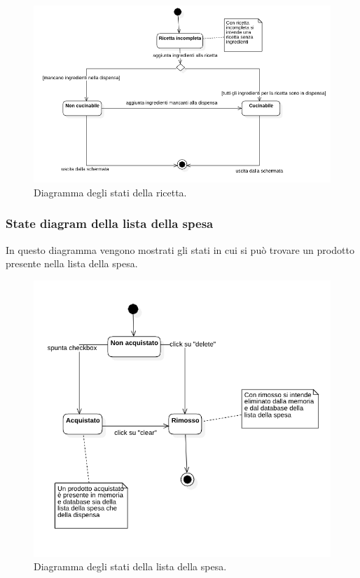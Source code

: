 \documentclass{article}
\begin{document}
\begin{figure}[H]
    \includegraphics[width=\linewidth]{images/state-recipe.png}
    \caption{Diagramma degli stati della ricetta.}
    \label{fig:staterecipe}
\end{figure}

\subsubsection{State diagram della lista della spesa}

In questo diagramma vengono mostrati gli stati in cui si può trovare un prodotto presente nella lista della spesa.

\begin{figure}[H]
    \includegraphics[width=\linewidth]{images/state-shopping-list.png}
    \caption{Diagramma degli stati della lista della spesa.}
    \label{fig:stateshoplist}
\end{figure}
\end{document}
